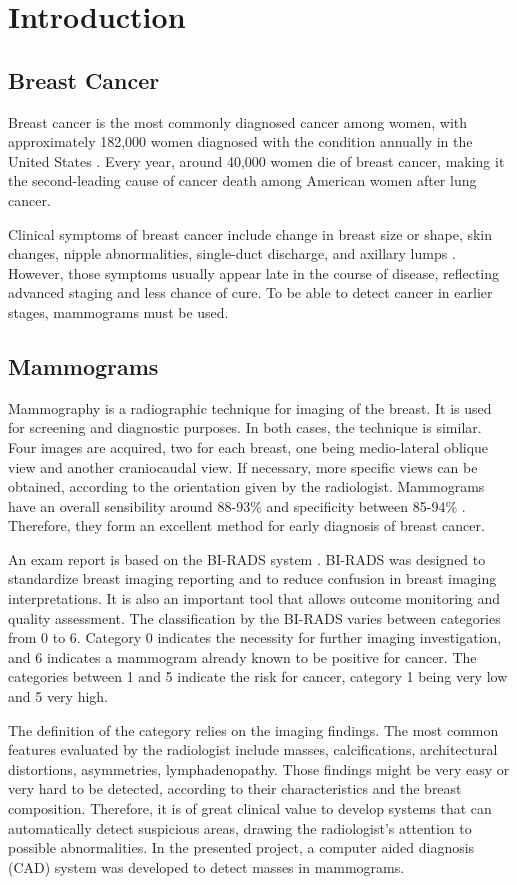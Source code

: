 \section{Introduction}
\label{sec:intro}
\subsection{Breast Cancer}
Breast cancer is the most commonly diagnosed cancer among women, with approximately 182,000 women diagnosed with the condition annually in the United States \cite{Jemal2009}. Every year, around 40,000 women die of breast cancer, making it the second-leading cause of cancer death among American women after lung cancer.\par
Clinical symptoms of breast cancer include change in breast size or shape, skin changes, nipple abnormalities, single-duct discharge, and axillary lumps \cite{Chalasani2018}. However, those symptoms usually appear late in the course of disease, reflecting advanced staging and less chance of cure. To be able to detect cancer in earlier stages, mammograms must be used.\par

\subsection{Mammograms}
Mammography is a radiographic technique for imaging of the breast. It is used for screening and diagnostic purposes. In both cases, the technique is similar. Four images are acquired, two for each breast, one being medio-lateral oblique view and another craniocaudal view. If necessary, more specific views can be obtained, according to the orientation given by the radiologist. Mammograms have an overall sensibility around 88-93\% and specificity between 85-94\% \cite{Saude2007}. Therefore, they form an excellent method for early diagnosis of breast cancer. \par
An exam report is based on the BI-RADS system \cite{Sickles2013}. BI-RADS was designed to standardize breast imaging reporting and to reduce confusion in breast imaging interpretations. It is also an important tool that allows outcome monitoring and quality assessment. The classification by the BI-RADS varies between categories from 0 to 6. Category 0 indicates the necessity for further imaging investigation, and 6 indicates a mammogram already known to be positive for cancer. The categories between 1 and 5 indicate the risk for cancer, category 1 being very low and 5 very high.\par
The definition of the category relies on the imaging findings. The most common features evaluated by the radiologist include masses, calcifications, architectural distortions, asymmetries, lymphadenopathy. Those findings might be very easy or very hard to be detected, according to their characteristics and the breast composition. Therefore, it is of great clinical value to develop systems that can automatically detect suspicious areas, drawing the radiologist's attention to possible abnormalities. In the presented project, a computer aided diagnosis (CAD) system was developed to detect masses in mammograms.\par